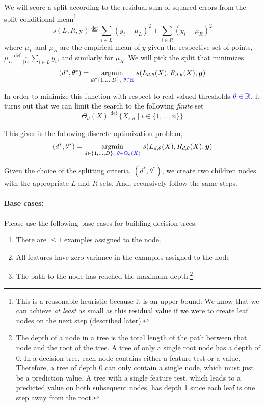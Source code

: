 \documentclass[11pt]{article}
\newcommand{\defeq}{\overset{\text{def}}{=}}
\begin{document}
\noindent We will score a split according to the residual sum of squared errors
from the split-conditional mean\footnote{This is a reasonable heuristic because it
  is an upper bound: We know that we can achieve \emph{at least} as small as
  this residual value if we were to create leaf nodes on the next step (described later).}
%
\begin{equation}\label{eq:split-critera}
  s(L, R, \boldsymbol{y}) \defeq
  \sum_{i \in L } (y_i - \mu_{L})^2
  + \sum_{ i \in R } (y_i - \mu_{R})^2
\end{equation}
%
\noindent where $\mu_{L}$ and $\mu_{R}$ are the empirical mean of $y$ given the
respective set of points, $\mu_{L} \defeq \frac{1}{|L|} \sum_{i \in L} y_i$, and
similarly for $\mu_R$.  We will pick the split that minimizes
%
\begin{equation}
(d^*, \theta^*) = \underset{d \in \{1, \ldots, D \},\ {\color{blue}\theta \in \mathbb{R}}}{\mathrm{argmin}}\ s(L_{d,\theta}(X), R_{d,\theta}(X), \boldsymbol{y})
\end{equation}

\noindent In order to minimize this function with respect to real-valued
thresholds ${\color{blue}\theta \in \mathbb{R}}$, it turns out that we can limit the search to the following \emph{finite} set
\begin{equation}
\Theta_d(X) \defeq \{ X_{i,d} \mid i \in \{1, \ldots, n\}\}
\end{equation}

\noindent This gives is the following discrete optimization problem,
\begin{equation}\label{eq:opt-split}
(d^*, \theta^*) = \underset{d \in \{1, \ldots, D \},\ {\color{blue}\theta \in \Theta_d(X)} }{\mathrm{argmin}}\ s(L_{d,\theta}(X), R_{d,\theta}(X), \boldsymbol{y})
\end{equation}

\noindent Given the choice of the splitting criteria, $(d^*, \theta^*)$, we
create two children nodes with the appropriate $L$ and $R$ sets.  And,
recursively follow the same steps.

\paragraph{Base cases:}
Please use the following base cases for building decision trees:
\begin{enumerate}
\item There are $\le 1$ examples assigned to the node.
\item All features have zero variance in the examples assigned to the node
\item The path to the node has reached the maximum depth.\footnote{The depth of a node in a tree is the total length of the path between that node and the root of the tree. A tree of only a single root node has a depth of 0. In a decision tree, each node contains either a feature test or a value. Therefore, a tree of depth 0 can only contain a single node, which must just be a prediction value. A tree with a single feature test, which leads to a predicted value on both subsequent nodes, has depth 1 since each leaf is one step away from the root.}
\end{enumerate}
\end{document}
